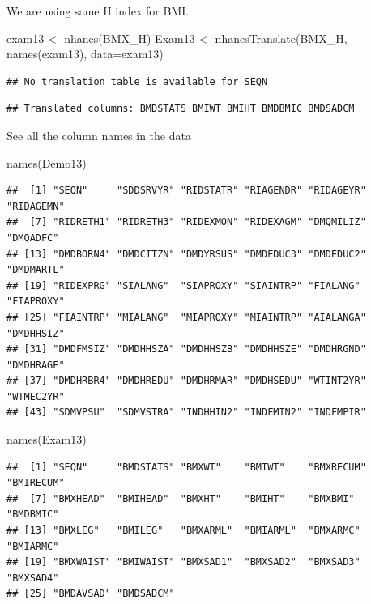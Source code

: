 \documentclass[
]{book}
\newenvironment{Shaded}{\begin{snugshade}}{\end{snugshade}}
\newcommand{\AttributeTok}[1]{\textcolor[rgb]{0.77,0.63,0.00}{#1}}
\newcommand{\FunctionTok}[1]{\textcolor[rgb]{0.00,0.00,0.00}{#1}}
\newcommand{\NormalTok}[1]{#1}
\newcommand{\OtherTok}[1]{\textcolor[rgb]{0.56,0.35,0.01}{#1}}
\newcommand{\StringTok}[1]{\textcolor[rgb]{0.31,0.60,0.02}{#1}}
\begin{document}
We are using same H index for BMI.

\begin{Shaded}
\begin{Highlighting}[]
\NormalTok{exam13 }\OtherTok{\textless{}{-}} \FunctionTok{nhanes}\NormalTok{(}\StringTok{\textquotesingle{}BMX\_H\textquotesingle{}}\NormalTok{)}
\NormalTok{Exam13 }\OtherTok{\textless{}{-}} \FunctionTok{nhanesTranslate}\NormalTok{(}\StringTok{\textquotesingle{}BMX\_H\textquotesingle{}}\NormalTok{, }\FunctionTok{names}\NormalTok{(exam13), }\AttributeTok{data=}\NormalTok{exam13)}
\end{Highlighting}
\end{Shaded}

\begin{verbatim}
## No translation table is available for SEQN
\end{verbatim}

\begin{verbatim}
## Translated columns: BMDSTATS BMIWT BMIHT BMDBMIC BMDSADCM
\end{verbatim}

See all the column names in the data

\begin{Shaded}
\begin{Highlighting}[]
\FunctionTok{names}\NormalTok{(Demo13)}
\end{Highlighting}
\end{Shaded}

\begin{verbatim}
##  [1] "SEQN"     "SDDSRVYR" "RIDSTATR" "RIAGENDR" "RIDAGEYR" "RIDAGEMN"
##  [7] "RIDRETH1" "RIDRETH3" "RIDEXMON" "RIDEXAGM" "DMQMILIZ" "DMQADFC" 
## [13] "DMDBORN4" "DMDCITZN" "DMDYRSUS" "DMDEDUC3" "DMDEDUC2" "DMDMARTL"
## [19] "RIDEXPRG" "SIALANG"  "SIAPROXY" "SIAINTRP" "FIALANG"  "FIAPROXY"
## [25] "FIAINTRP" "MIALANG"  "MIAPROXY" "MIAINTRP" "AIALANGA" "DMDHHSIZ"
## [31] "DMDFMSIZ" "DMDHHSZA" "DMDHHSZB" "DMDHHSZE" "DMDHRGND" "DMDHRAGE"
## [37] "DMDHRBR4" "DMDHREDU" "DMDHRMAR" "DMDHSEDU" "WTINT2YR" "WTMEC2YR"
## [43] "SDMVPSU"  "SDMVSTRA" "INDHHIN2" "INDFMIN2" "INDFMPIR"
\end{verbatim}

\begin{Shaded}
\begin{Highlighting}[]
\FunctionTok{names}\NormalTok{(Exam13)}
\end{Highlighting}
\end{Shaded}

\begin{verbatim}
##  [1] "SEQN"     "BMDSTATS" "BMXWT"    "BMIWT"    "BMXRECUM" "BMIRECUM"
##  [7] "BMXHEAD"  "BMIHEAD"  "BMXHT"    "BMIHT"    "BMXBMI"   "BMDBMIC" 
## [13] "BMXLEG"   "BMILEG"   "BMXARML"  "BMIARML"  "BMXARMC"  "BMIARMC" 
## [19] "BMXWAIST" "BMIWAIST" "BMXSAD1"  "BMXSAD2"  "BMXSAD3"  "BMXSAD4" 
## [25] "BMDAVSAD" "BMDSADCM"
\end{verbatim}
\end{document}
